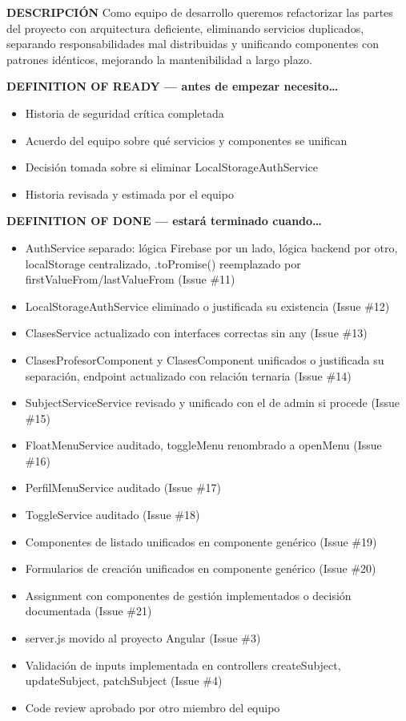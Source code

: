 \documentclass[
  spanish,
  11pt,
]{report}
\providecommand{\tightlist}{%
  \setlength{\itemsep}{0pt}\setlength{\parskip}{0pt}}
\begin{document}
\textbf{DESCRIPCIÓN} Como equipo de desarrollo queremos refactorizar las
partes del proyecto con arquitectura deficiente, eliminando servicios
duplicados, separando responsabilidades mal distribuidas y unificando
componentes con patrones idénticos, mejorando la mantenibilidad a largo
plazo.

\textbf{DEFINITION OF READY --- antes de empezar necesito\ldots{}}

\begin{itemize}
\tightlist
\item
  Historia de seguridad crítica completada
\item
  Acuerdo del equipo sobre qué servicios y componentes se unifican
\item
  Decisión tomada sobre si eliminar LocalStorageAuthService
\item
  Historia revisada y estimada por el equipo
\end{itemize}

\textbf{DEFINITION OF DONE --- estará terminado cuando\ldots{}}

\begin{itemize}
\tightlist
\item
  AuthService separado: lógica Firebase por un lado, lógica backend por
  otro, localStorage centralizado, .toPromise() reemplazado por
  firstValueFrom/lastValueFrom (Issue \#11)
\item
  LocalStorageAuthService eliminado o justificada su existencia (Issue
  \#12)
\item
  ClasesService actualizado con interfaces correctas sin any (Issue
  \#13)
\item
  ClasesProfesorComponent y ClasesComponent unificados o justificada su
  separación, endpoint actualizado con relación ternaria (Issue \#14)
\item
  SubjectServiceService revisado y unificado con el de admin si procede
  (Issue \#15)
\item
  FloatMenuService auditado, toggleMenu renombrado a openMenu (Issue
  \#16)
\item
  PerfilMenuService auditado (Issue \#17)
\item
  ToggleService auditado (Issue \#18)
\item
  Componentes de listado unificados en componente genérico (Issue \#19)
\item
  Formularios de creación unificados en componente genérico (Issue \#20)
\item
  Assignment con componentes de gestión implementados o decisión
  documentada (Issue \#21)
\item
  server.js movido al proyecto Angular (Issue \#3)
\item
  Validación de inputs implementada en controllers createSubject,
  updateSubject, patchSubject (Issue \#4)
\item
  Code review aprobado por otro miembro del equipo
\end{itemize}
\end{document}
